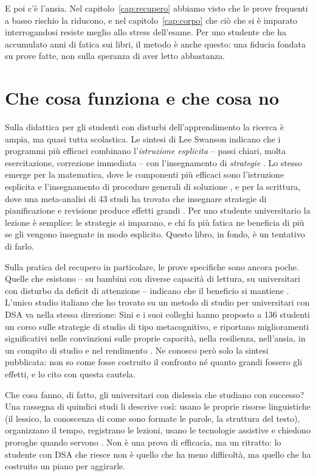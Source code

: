 E poi c'è l'ansia. Nel capitolo~\ref{cap:recupero} abbiamo visto che le
prove frequenti a basso rischio la riducono, e nel
capitolo~\ref{cap:corpo} che ciò che si è imparato interrogandosi
resiste meglio allo stress dell'esame. Per uno studente che ha
accumulato anni di fatica sui libri, il metodo è anche questo: una
fiducia fondata su prove fatte, non sulla speranza di aver letto
abbastanza.

\section{Che cosa funziona e che cosa no}

Sulla didattica per gli studenti con disturbi dell'apprendimento la
ricerca è ampia, ma quasi tutta scolastica. Le sintesi di Lee Swanson
indicano che i programmi più efficaci combinano l'\emph{istruzione
esplicita} -- passi chiari, molta esercitazione, correzione immediata
-- con l'insegnamento di \emph{strategie} \parencite{swanson1999}. Lo
stesso emerge per la matematica, dove le componenti più efficaci sono
l'istruzione esplicita e l'insegnamento di procedure generali di
soluzione \parencite{gersten2009}, e per la scrittura, dove una
meta-analisi di 43 studi ha trovato che insegnare strategie di
pianificazione e revisione produce effetti grandi \parencite{gillespie2014}.
Per uno studente universitario la lezione è semplice: le strategie si
imparano, e chi fa più fatica ne beneficia di più se gli vengono
insegnate in modo esplicito. Questo libro, in fondo, è un tentativo di
farlo.

Sulla pratica del recupero in particolare, le prove specifiche sono
ancora poche. Quelle che esistono -- su bambini con diverse capacità di
lettura, su universitari con disturbo da deficit di attenzione --
indicano che il beneficio si mantiene
\parencite{karpicke2016,knouse2016}. L'unico studio italiano che ho
trovato su un metodo di studio per universitari con DSA va nella
stessa direzione: Sini e i suoi colleghi hanno proposto a 136
studenti un corso sulle strategie di studio di tipo metacognitivo, e
riportano miglioramenti significativi nelle convinzioni sulle proprie
capacità, nella resilienza, nell'ansia, in un compito di studio e nel
rendimento \parencite{sini2025}. Ne conosco però solo la sintesi
pubblicata: non so come fosse costruito il confronto né quanto grandi
fossero gli effetti, e lo cito con questa cautela.

Che cosa fanno, di fatto, gli universitari con dislessia che studiano
con successo? Una rassegna di quindici studi li descrive così: usano le
proprie risorse linguistiche (il lessico, la conoscenza di come sono
formate le parole, la struttura del testo), organizzano il tempo,
registrano le lezioni, usano le tecnologie assistive e chiedono
proroghe quando servono \parencite{knight2025}. Non è una prova di
efficacia, ma un ritratto: lo studente con DSA che riesce non è quello
che ha meno difficoltà, ma quello che ha costruito un piano per
aggirarle.

